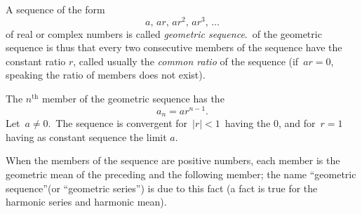 \documentclass[12pt]{article}
\begin{document}
A sequence of the form
                       $$a,\,ar,\,ar^2,\,ar^3,\,\ldots$$
of real or complex numbers is called {\em geometric sequence}.\,  of the geometric sequence is thus that every two consecutive members of the sequence have the constant ratio $r$, called usually the {\em common ratio} of the sequence (if\, $ar = 0$,  speaking the ratio of members does not exist). 

The $n^\mathrm{th}$ member of the geometric sequence has the 
                          $$a_n = ar^{n-1}.$$
Let\, $a \neq 0$.\, The sequence is convergent for\, $|r| < 1$\, having the  0, and for\, $r = 1$\, having as constant sequence the limit $a$.

When the members of the sequence are positive numbers, each member is the geometric mean of the preceding and the following member; the name ``geometric sequence''(or ``geometric series'') is due to this fact (a  fact is true for the harmonic series and harmonic mean).
\end{document}
